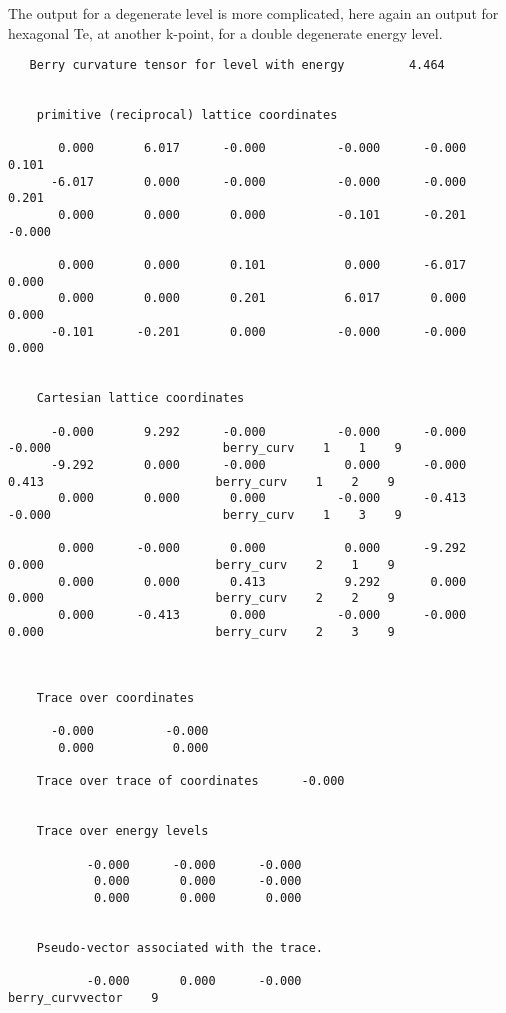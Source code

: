 \documentclass[11pt]{article}
\begin{document}
\begin{itemize}
      The output for a degenerate level is more complicated,
      here again an output for hexagonal Te, at another k-point,
      for a double degenerate energy level.
      \begin{verbatim}
   Berry curvature tensor for level with energy         4.464


    primitive (reciprocal) lattice coordinates

       0.000       6.017      -0.000          -0.000      -0.000       0.101
      -6.017       0.000      -0.000          -0.000      -0.000       0.201
       0.000       0.000       0.000          -0.101      -0.201      -0.000

       0.000       0.000       0.101           0.000      -6.017       0.000
       0.000       0.000       0.201           6.017       0.000       0.000
      -0.101      -0.201       0.000          -0.000      -0.000       0.000


    Cartesian lattice coordinates

      -0.000       9.292      -0.000          -0.000      -0.000      -0.000                        berry_curv    1    1    9
      -9.292       0.000      -0.000           0.000      -0.000       0.413                        berry_curv    1    2    9
       0.000       0.000       0.000          -0.000      -0.413      -0.000                        berry_curv    1    3    9

       0.000      -0.000       0.000           0.000      -9.292       0.000                        berry_curv    2    1    9
       0.000       0.000       0.413           9.292       0.000       0.000                        berry_curv    2    2    9
       0.000      -0.413       0.000          -0.000      -0.000       0.000                        berry_curv    2    3    9



    Trace over coordinates

      -0.000          -0.000
       0.000           0.000

    Trace over trace of coordinates      -0.000


    Trace over energy levels

           -0.000      -0.000      -0.000
            0.000       0.000      -0.000
            0.000       0.000       0.000


    Pseudo-vector associated with the trace.

           -0.000       0.000      -0.000                    berry_curvvector    9


\end{verbatim}
\end{itemize}
\end{document}
